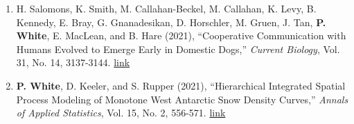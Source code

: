 \documentclass[11pt]{article}
\begin{document}
\begin{enumerate}[label=$\bullet$]

\item H. Salomons, K. Smith, M. Callahan-Beckel, M. Callahan, K. Levy, B. Kennedy, E. Bray, G. Gnanadesikan, D. Horschler, M. Gruen, J. Tan, \textbf{P. White}, E. MacLean, and B. Hare (2021), ``Cooperative Communication with Humans Evolved to Emerge Early in Domestic Dogs,'' \textit{Current Biology}, Vol. 31, No. 14, 3137-3144. \href{https://www.cell.com/current-biology/fulltext/S0960-9822(21)00880-0}{link} 


\item \textbf{P. White}, D. Keeler, and S. Rupper (2021), ``Hierarchical Integrated Spatial Process Modeling of Monotone West Antarctic Snow Density Curves,'' \textit{Annals of Applied Statistics}, Vol. 15, No. 2, 556-571. \href{http://dx.doi.org/10.1214/21-AOAS1443}{link}


\end{enumerate}
\end{document}
